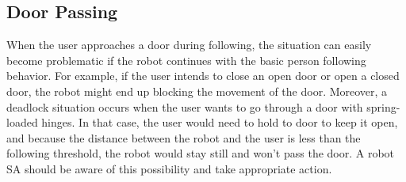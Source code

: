 %
%
%
%

\subsection{Door Passing}
\label{sec:following_door_passing}

When the user approaches a door during following, the situation can easily become problematic if the robot continues with the basic person following behavior. For example, if the user intends to close an open door or open a closed door, the robot might end up blocking the movement of the door. Moreover, a deadlock situation occurs when the user wants to go through a door with spring-loaded hinges. In that case, the user would need to hold to door to keep it open, and because the distance between the robot and the user is less than the following threshold, the robot would stay still and won't pass the door. A robot SA should be aware of this possibility and take appropriate action. 

